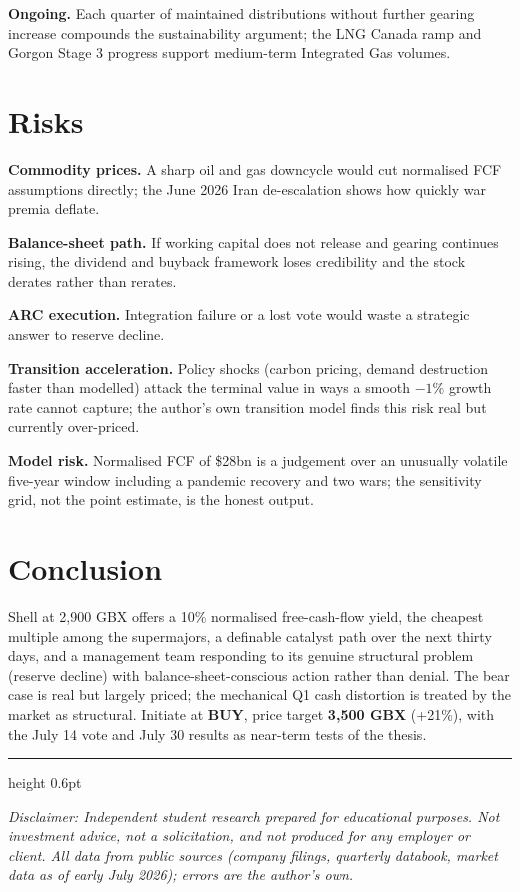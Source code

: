 \documentclass[10pt,a4paper]{article}
\newcommand{\about}{\raisebox{0.4ex}{\texttildelow}}
\begin{document}
\textbf{Ongoing.} Each quarter of maintained distributions without further gearing increase compounds the sustainability argument; the LNG Canada ramp and Gorgon Stage 3 progress support medium-term Integrated Gas volumes.

\section{Risks}

\textbf{Commodity prices.} A sharp oil and gas downcycle would cut normalised FCF assumptions directly; the June 2026 Iran de-escalation shows how quickly war premia deflate.

\textbf{Balance-sheet path.} If working capital does not release and gearing continues rising, the dividend and buyback framework loses credibility and the stock derates rather than rerates.

\textbf{ARC execution.} Integration failure or a lost vote would waste a strategic answer to reserve decline.

\textbf{Transition acceleration.} Policy shocks (carbon pricing, demand destruction faster than modelled) attack the terminal value in ways a smooth $-1\%$ growth rate cannot capture; the author's own transition model finds this risk real but currently over-priced.

\textbf{Model risk.} Normalised FCF of \$28bn is a judgement over an unusually volatile five-year window including a pandemic recovery and two wars; the sensitivity grid, not the point estimate, is the honest output.

\section{Conclusion}

Shell at \about2,900 GBX offers a \about10\% normalised free-cash-flow yield, the cheapest multiple among the supermajors, a definable catalyst path over the next thirty days, and a management team responding to its genuine structural problem (reserve decline) with balance-sheet-conscious action rather than denial. The bear case is real but largely priced; the mechanical Q1 cash distortion is treated by the market as structural. Initiate at \textbf{BUY}, price target \textbf{3,500 GBX} (+21\%), with the July 14 vote and July 30 results as near-term tests of the thesis.

\vspace{10pt}
{\color{rule}\hrule height 0.6pt}
\vspace{4pt}
{\sffamily\scriptsize\color{grey}\textit{Disclaimer: Independent student research prepared for educational purposes. Not investment advice, not a solicitation, and not produced for any employer or client. All data from public sources (company filings, quarterly databook, market data as of early July 2026); errors are the author's own.}}
\end{document}
